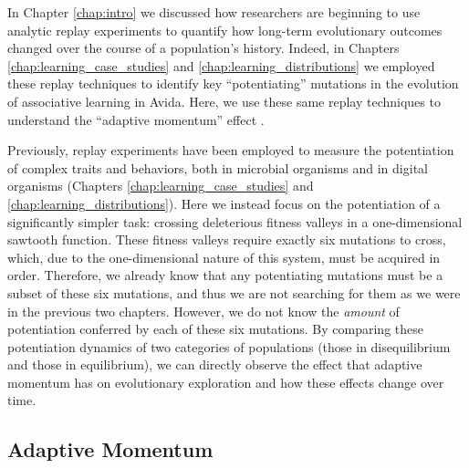 In Chapter \ref{chap:intro} we discussed how researchers are beginning to use analytic replay experiments to quantify how long-term evolutionary outcomes changed over the course of a population's history. 
Indeed, in Chapters \ref{chap:learning_case_studies} and \ref{chap:learning_distributions} we employed these replay techniques to identify key ``potentiating'' mutations in the evolution of associative learning in Avida. 
Here, we use these same replay techniques to understand the ``adaptive momentum'' effect \citep{Bohm2024.04.08.588357}.

Previously, replay experiments have been employed to measure the potentiation of complex traits and behaviors, both in microbial organisms \citep{blountHistoricalContingencyEvolution2008, meyerRepeatabilityContingencyEvolution2012, guptaHostparasiteCoevolutionPromotes2022, jochumsenEvolutionAntimicrobialPeptide2016a} and in digital organisms (Chapters \ref{chap:learning_case_studies} and \ref{chap:learning_distributions}).
Here we instead focus on the potentiation of a significantly simpler task: crossing deleterious fitness valleys in a one-dimensional sawtooth function. 
These fitness valleys require exactly six mutations to cross, which, due to the one-dimensional nature of this system, must be acquired in order. 
Therefore, we already know that any potentiating mutations must be a subset of these six mutations, and thus we are not searching for them as we were in the previous two chapters. 
However, we do not know the \textit{amount} of potentiation conferred by each of these six mutations. 
By comparing these potentiation dynamics of two categories of populations (those in disequilibrium and those in equilibrium), we can directly observe the effect that adaptive momentum has on evolutionary exploration and how these effects change over time. 

\subsection{Adaptive Momentum}

